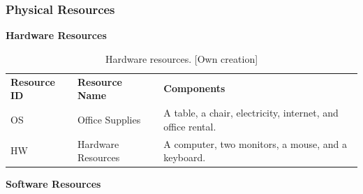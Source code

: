 \subsubsection{Physical Resources}
\label{sec:physical-resources}


\textbf{Hardware Resources}

\vspace{-5pt}

\begin{table}[H]
    \centering  
    \footnotesize
    \renewcommand{\arraystretch}{1.2}
    \setlength{\arrayrulewidth}{0.8pt}
    \begin{tabularx}{\textwidth}{>{\centering\arraybackslash}p{3cm} >{\centering\arraybackslash}p{3cm} p{8.2cm}}
        \rowcolor{gray!40} 
        \textbf{Resource ID} & \textbf{Resource Name} & \parbox[c][\height][c]{\hsize}{\centering \textbf{Components}} \\ 
        OS & Office Supplies & A table, a chair, electricity, internet, and office rental. \\
        HW & Hardware Resources & A computer, two monitors, a mouse, and a keyboard. \\
    \end{tabularx}
    \caption[ Hardware resources]
    {Hardware resources. [Own creation]} 
    \vspace{-1em}
    \label{table:hardware-resources-table} 
\end{table} 

\vspace{-10pt}

\newpage

\textbf{Software Resources}

\vspace{-5pt}






